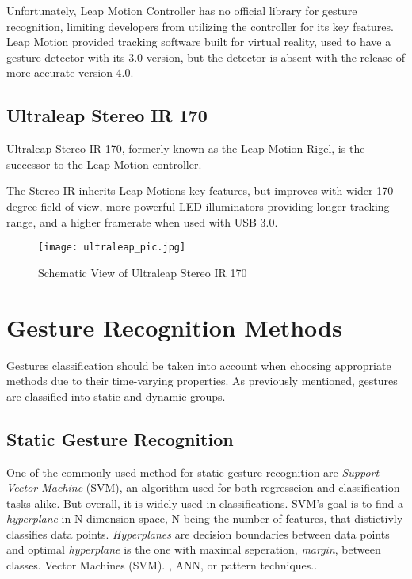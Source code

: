 Unfortunately, Leap Motion Controller has no official library for gesture recognition, limiting developers from utilizing the controller for its key features. Leap Motion provided tracking software built for virtual reality, used to have a gesture detector with its 3.0 version, but the detector is absent with the release of more accurate version 4.0.

\subsection{Ultraleap Stereo IR 170}

Ultraleap Stereo IR 170, formerly known as the Leap Motion Rigel, is the successor to the Leap Motion controller.

The Stereo IR inherits Leap Motions key features, but improves with wider 170-degree field of view, more-powerful LED illuminators providing longer tracking range, and a higher framerate when used with USB 3.0.\cite{ultraleap}\cite{ultraleap2}

\begin{figure}[H]
	\centering
    \texttt{[image: ultraleap\_pic.jpg]}
	\caption{Schematic View of Ultraleap Stereo IR 170 \cite{ultraleap}}
	\label{fig:lmcScheme}
\end{figure}



\section{Gesture Recognition Methods
}

Gestures classification should be taken into account when choosing appropriate methods due to their time-varying properties. As previously mentioned, gestures are classified into static and dynamic groups. 

\subsection{Static Gesture Recognition}

One of the commonly used method for static gesture recognition are \textit{Support Vector Machine} (SVM), an algorithm used for both regresseion and classification tasks alike. But overall, it is widely used in classifications. SVM's goal is to find a \textit{hyperplane} in N-dimension space, N being the number of features, that distictivly classifies data points.\cite{svmIntroToML} 
\textit{Hyperplanes} are decision boundaries between data points and optimal \textit{hyperplane} is the one with maximal seperation, \textit{margin}, between classes.
Vector Machines (SVM). , ANN, or pattern techniques.\cite{savaris}.

